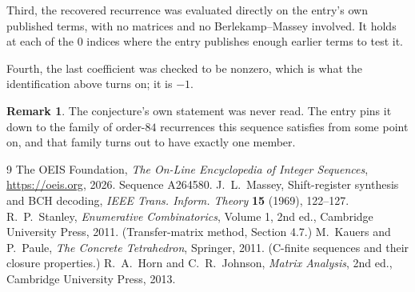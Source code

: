 \documentclass[11pt,a4paper]{article}
\theoremstyle{plain}
\theoremstyle{definition}
\newtheorem{remark}[theorem]{Remark}
\begin{document}
Third, the recovered recurrence was evaluated directly on the entry's own published terms, with
no matrices and no Berlekamp--Massey involved. It holds at each of the $0$ indices where
the entry publishes enough earlier terms to test it.

Fourth, the last coefficient was checked to be nonzero, which is what the identification above
turns on; it is $-1$.

\begin{remark}
The conjecture's own statement was never read. The entry pins it down to the family of
order-$84$ recurrences this sequence satisfies from some point on, and that family turns
out to have exactly one member.
\end{remark}

\begin{thebibliography}{9}
 The OEIS Foundation, \emph{The On-Line Encyclopedia of Integer
Sequences}, \url{https://oeis.org}, 2026. Sequence A264580.
 J.~L.~Massey, Shift-register synthesis and BCH decoding, \emph{IEEE
Trans. Inform. Theory} \textbf{15} (1969), 122--127.
 R.~P.~Stanley, \emph{Enumerative Combinatorics}, Volume 1, 2nd ed.,
Cambridge University Press, 2011. (Transfer-matrix method, Section 4.7.)
 M.~Kauers and P.~Paule, \emph{The Concrete Tetrahedron}, Springer, 2011.
(C-finite sequences and their closure properties.)
 R.~A.~Horn and C.~R.~Johnson, \emph{Matrix Analysis}, 2nd ed., Cambridge
University Press, 2013.
\end{thebibliography}
\end{document}

